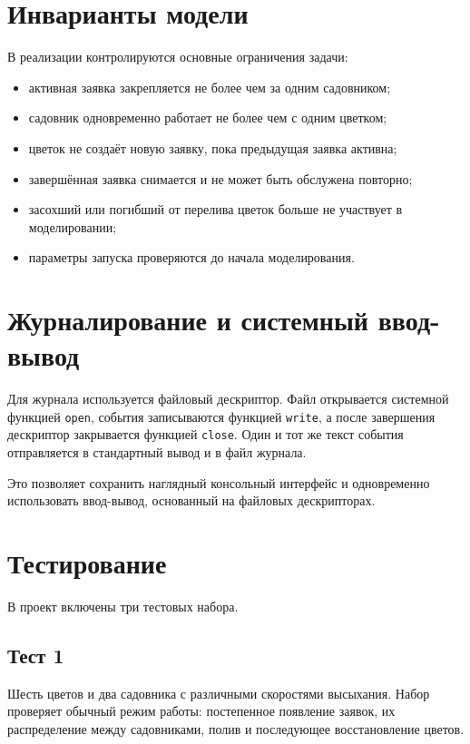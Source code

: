 \documentclass[12pt,a4paper]{article}
\begin{document}
\section{Инварианты модели}

В реализации контролируются основные ограничения задачи:
\begin{itemize}[noitemsep]
    \item активная заявка закрепляется не более чем за одним садовником;
    \item садовник одновременно работает не более чем с одним цветком;
    \item цветок не создаёт новую заявку, пока предыдущая заявка активна;
    \item завершённая заявка снимается и не может быть обслужена повторно;
    \item засохший или погибший от перелива цветок больше не участвует в моделировании;
    \item параметры запуска проверяются до начала моделирования.
\end{itemize}

\section{Журналирование и системный ввод-вывод}

Для журнала используется файловый дескриптор. Файл открывается системной
функцией \texttt{open}, события записываются функцией \texttt{write}, а после
завершения дескриптор закрывается функцией \texttt{close}. Один и тот же текст
события отправляется в стандартный вывод и в файл журнала.

Это позволяет сохранить наглядный консольный интерфейс и одновременно
использовать ввод-вывод, основанный на файловых дескрипторах.

\section{Тестирование}

В проект включены три тестовых набора.

\subsection*{Тест 1}
Шесть цветов и два садовника с различными скоростями высыхания. Набор проверяет
обычный режим работы: постепенное появление заявок, их распределение между
садовниками, полив и последующее восстановление цветов.
\end{document}
